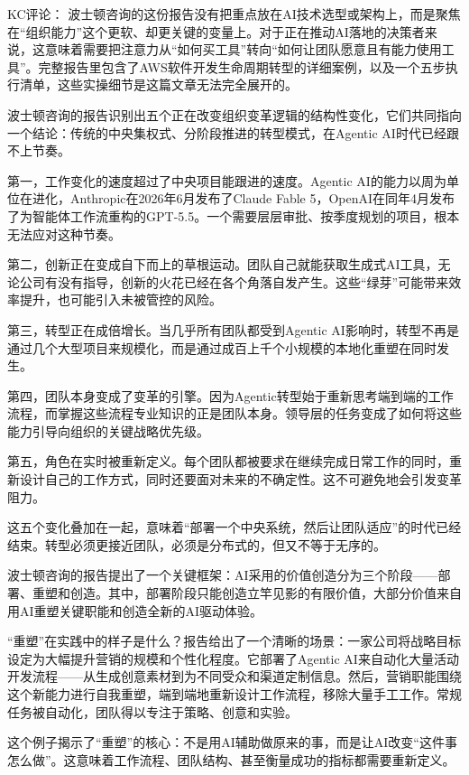 \documentclass[11pt]{ctexart}
\begin{document}
KC评论： 波士顿咨询的这份报告没有把重点放在AI技术选型或架构上，而是聚焦在“组织能力”这个更软、却更关键的变量上。对于正在推动AI落地的决策者来说，这意味着需要把注意力从“如何买工具”转向“如何让团队愿意且有能力使用工具”。完整报告里包含了AWS软件开发生命周期转型的详细案例，以及一个五步执行清单，这些实操细节是这篇文章无法完全展开的。

波士顿咨询的报告识别出五个正在改变组织变革逻辑的结构性变化，它们共同指向一个结论：传统的中央集权式、分阶段推进的转型模式，在Agentic AI时代已经跟不上节奏。

第一，工作变化的速度超过了中央项目能跟进的速度。Agentic AI的能力以周为单位在进化，Anthropic在2026年6月发布了Claude Fable 5，OpenAI在同年4月发布了为智能体工作流重构的GPT-5.5。一个需要层层审批、按季度规划的项目，根本无法应对这种节奏。

第二，创新正在变成自下而上的草根运动。团队自己就能获取生成式AI工具，无论公司有没有指导，创新的火花已经在各个角落自发产生。这些“绿芽”可能带来效率提升，也可能引入未被管控的风险。

第三，转型正在成倍增长。当几乎所有团队都受到Agentic AI影响时，转型不再是通过几个大型项目来规模化，而是通过成百上千个小规模的本地化重塑在同时发生。

第四，团队本身变成了变革的引擎。因为Agentic转型始于重新思考端到端的工作流程，而掌握这些流程专业知识的正是团队本身。领导层的任务变成了如何将这些能力引导向组织的关键战略优先级。

第五，角色在实时被重新定义。每个团队都被要求在继续完成日常工作的同时，重新设计自己的工作方式，同时还要面对未来的不确定性。这不可避免地会引发变革阻力。

这五个变化叠加在一起，意味着“部署一个中央系统，然后让团队适应”的时代已经结束。转型必须更接近团队，必须是分布式的，但又不等于无序的。

波士顿咨询的报告提出了一个关键框架：AI采用的价值创造分为三个阶段——部署、重塑和创造。其中，部署阶段只能创造立竿见影的有限价值，大部分价值来自用AI重塑关键职能和创造全新的AI驱动体验。

“重塑”在实践中的样子是什么？报告给出了一个清晰的场景：一家公司将战略目标设定为大幅提升营销的规模和个性化程度。它部署了Agentic AI来自动化大量活动开发流程——从生成创意素材到为不同受众和渠道定制信息。然后，营销职能围绕这个新能力进行自我重塑，端到端地重新设计工作流程，移除大量手工工作。常规任务被自动化，团队得以专注于策略、创意和实验。

这个例子揭示了“重塑”的核心：不是用AI辅助做原来的事，而是让AI改变“这件事怎么做”。这意味着工作流程、团队结构、甚至衡量成功的指标都需要重新定义。
\end{document}

